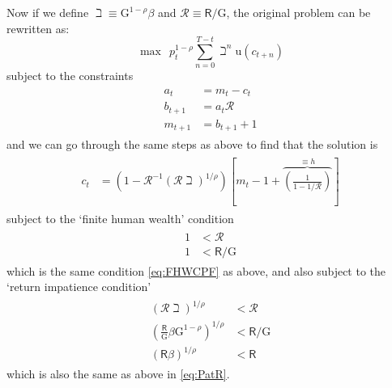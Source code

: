\documentclass{scrartcl}
\begin{document}
Now if we define $\beth \equiv {\ensuremath{\mathrm{G}}}^{1-\rho}\beta$ and $\mathscr{R} \equiv \mathsf{R}/{\ensuremath{\mathrm{G}}}$,
the original problem can be rewritten as:
\begin{equation}
\max~~\boldsymbol{\mathit{p}}_{t}^{1-\rho}\sum_{n=0}^{T-t} \beth^{n} \mathrm{u}(c_{t+n})             \label{eq:scaledmaxprob}
\end{equation}
subject to the constraints
\begin{equation}\begin{gathered}\begin{aligned}
   a_{t}   & =  m_{t}-c_{t}
\\ b_{t+1} & =  a_{t}\mathscr{R}
\\ m_{t+1} & =  b_{t+1}+1
\end{aligned}\end{gathered}\end{equation}
and we can go through the same steps as above to find that the solution
is
\begin{equation}\begin{gathered}\begin{aligned}
        c_{t} & =  (1-\mathscr{R}^{-1}(\mathscr{R}\beth)^{1/\rho})\left[m_{t}-1+\overbrace{\left(\frac{1}{1-{1}/\mathscr{R}}\right)}^{\equiv h}\right] \label{eq:normC}
\end{aligned}\end{gathered}\end{equation}
subject to the `finite human wealth' condition
\begin{equation}\begin{gathered}\begin{aligned}
        {1} & <  \mathscr{R}
\\  1 & <  \mathsf{R}/\ensuremath{\mathrm{G}}
\end{aligned}\end{gathered}\end{equation}
which is the same condition \eqref{eq:FHWCPF} as above, and also subject to the `return impatience condition'
\begin{equation}\begin{gathered}\begin{aligned}
                (\mathscr{R}\beth)^{1/\rho} & <  \mathscr{R}  
\\              \left(\frac{\mathsf{R}}{{\ensuremath{\mathrm{G}}}}\beta {\ensuremath{\mathrm{G}}}^{1-\rho}\right)^{1/\rho} & <  \mathsf{R}/{\ensuremath{\mathrm{G}}}  
\\              (\mathsf{R}\beta)^{1/\rho} & <  \mathsf{R}  
\end{aligned}\end{gathered}\end{equation}  
which is also the same as above in \eqref{eq:PatR}.
\end{document}
